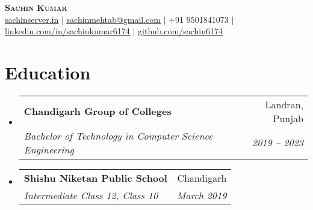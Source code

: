 \documentclass[letterpaper,11pt]{article}
\makeatletter
\newcommand{\resumeSubheading}[4]{
  \vspace{-2pt}\item
    \begin{tabular*}{0.97\textwidth}[t]{l@{\extracolsep{\fill}}r}
      \textbf{#1} & #2 \\
      \textit{\small#3} & \textit{\small #4} \\
    \end{tabular*}\vspace{-7pt}
}
\newcommand{\resumeSubHeadingListStart}{\begin{itemize}[leftmargin=0.15in, label={}]}
\newcommand{\resumeSubHeadingListEnd}{\end{itemize}}
\makeatother
\begin{document}

\begin{center}
    \textbf{\Huge \scshape Sachin Kumar} \\ \vspace{1pt}
    \small \href{https://sachinserver.in}{\underline{sachinserver.in}} $|$ 
    \href{mailto:sachinmehtab@gmail.com}{\underline{sachinmehtab@gmail.com}} $|$ 
    +91 9501841073 $|$ 
    \href{https://linkedin.com/in/sachinkumar6174}{\underline{linkedin.com/in/sachinkumar6174}} $|$
    \href{https://github.com/sachin6174}{\underline{github.com/sachin6174}}
\end{center}


\section{Education}
  \resumeSubHeadingListStart
    \resumeSubheading
      {Chandigarh Group of Colleges}{Landran, Punjab}
      {Bachelor of Technology in Computer Science Engineering}{2019 -- 2023}
    \resumeSubheading
      {Shishu Niketan Public School}{Chandigarh}
      {Intermediate Class 12, Class 10}{March 2019}
  \resumeSubHeadingListEnd


\end{document}
